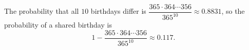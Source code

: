 The probability that all $10$ birthdays differ is $\dfrac{365\cdot364\cdots356}{365^{10}}\approx0.8831$, so the probability of a shared birthday is
\[\boxed{1-\dfrac{365\cdot364\cdots356}{365^{10}}\approx0.117}.\]
